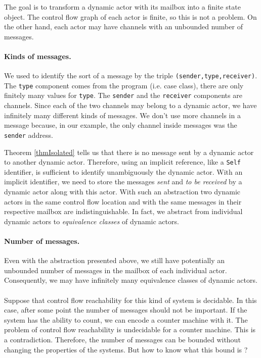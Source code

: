 \documentclass[a4paper]{report}
\numberwithin{algorithm}{chapter}
\begin{document}
The goal is to transform a dynamic actor with its mailbox into a finite state object.
The control flow graph of each actor is finite, so this is not a problem.
On the other hand, each actor may have channels with an unbounded number of messages.

\paragraph{Kinds of messages.}
We used to identify the sort of a message by the triple \texttt{(sender,type,receiver)}.
The \texttt{type} component comes from the program (i.e. \scala{} case class), there are only finitely many values for \texttt{type}.
The \texttt{sender} and the \texttt{receiver} components are channels.
Since each of the two channels may belong to a dynamic actor, we have infinitely many different kinds of messages.
We don't use more channels in a message because, in our example, the only channel inside messages was the \scala{} \texttt{sender} address.

Theorem \ref{thmIsolated} tells us that there is no message sent by a dynamic actor to another dynamic actor.
Therefore, using an implicit reference, like a \texttt{Self} identifier, is sufficient to identify unambiguously the dynamic actor.
With an implicit identifier, we need to store the messages \emph{sent} and \emph{to be received} by a dynamic actor along with this actor.
With such an abstraction two dynamic actors in the same control flow location and with the same messages in their respective mailbox are indistinguishable.
In fact, we abstract from individual dynamic actors to \emph{equivalence classes} of dynamic actors.

\paragraph{Number of messages.}
Even with the abstraction presented above, we still have potentially an unbounded number of messages in the mailbox of each individual actor.
Consequently, we may have infinitely many equivalence classes of dynamic actors.

\paragraph{}
Suppose that control flow reachability for this kind of system is decidable.
In this case, after some point the number of messages should not be important.
If the system has the ability to count, we can encode a counter machine with it.
The problem of control flow reachability is undecidable for a counter machine.
This is a contradiction.
Therefore, the number of messages can be bounded without changing the properties of the systems.
But how to know what this bound is ?
\end{document}
